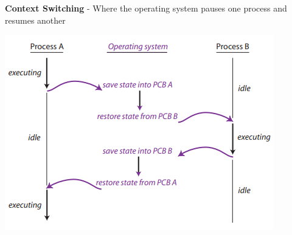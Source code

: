 \documentclass{article}[18pt]
\begin{document}
\textbf{Context Switching} - Where the operating system pauses one process and resumes another
\begin{center}
	\includegraphics[scale=0.5]{context_switching}
\end{center}
\end{document}
